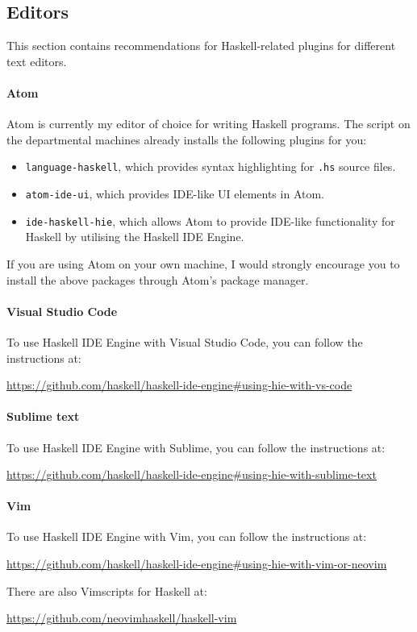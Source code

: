 \subsection{Editors}

This section contains recommendations for Haskell-related plugins for different text editors.

\paragraph{Atom} Atom is currently my editor of choice for writing Haskell programs. The  script on the departmental machines already installs the following plugins for you:
\begin{itemize}
	\item \texttt{\small language-haskell}, which provides syntax highlighting for \texttt{\small .hs} source files.
	\item \texttt{\small atom-ide-ui}, which provides IDE-like UI elements in Atom.
	\item \texttt{\small ide-haskell-hie}, which allows Atom to provide IDE-like functionality for Haskell by utilising the Haskell IDE Engine. 
\end{itemize}
If you are using Atom on your own machine, I would strongly encourage you to install the above packages through Atom's package manager.

\paragraph{Visual Studio Code} To use Haskell IDE Engine with Visual Studio Code, you can follow the instructions at:
\begin{center}
	\url{https://github.com/haskell/haskell-ide-engine#using-hie-with-vs-code}
\end{center}

\paragraph{Sublime text} To use Haskell IDE Engine with Sublime, you can follow the instructions at:
\begin{center}
	\url{https://github.com/haskell/haskell-ide-engine#using-hie-with-sublime-text}
\end{center}

\paragraph{Vim} To use Haskell IDE Engine with Vim, you can follow the instructions at:
\begin{center}
	\url{https://github.com/haskell/haskell-ide-engine#using-hie-with-vim-or-neovim}
\end{center}
There are also Vimscripts for Haskell at:
\begin{center}
\url{https://github.com/neovimhaskell/haskell-vim}
\end{center}

